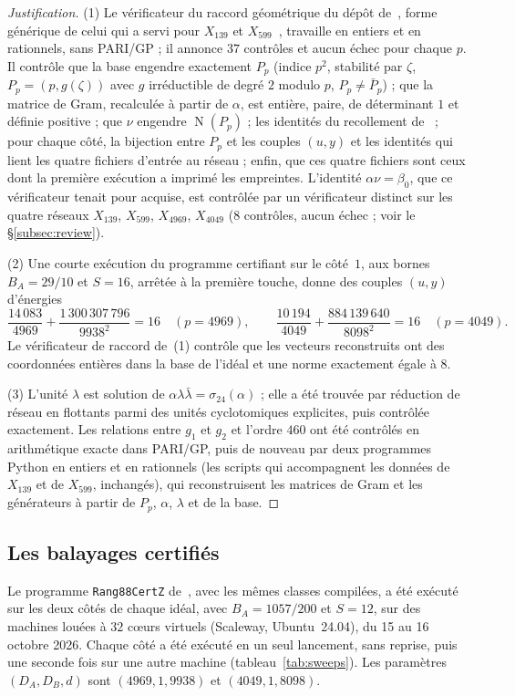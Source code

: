 \documentclass[11pt,a4paper]{amsart}
\theoremstyle{plain}
\theoremstyle{definition}
\DeclareMathOperator{\Nm}{N}
\begin{document}
\begin{proof}[Justification]
(1) Le vérificateur du raccord géométrique du dépôt de~\cite{Gau26}, forme générique de celui qui a servi pour $X_{139}$ et $X_{599}$~\cite[prop.~6.3, 6.4]{Gau26}, travaille en entiers et en rationnels, sans PARI/GP ; il annonce $37$ contrôles et aucun échec pour chaque $p$. Il contrôle que la base engendre exactement $P_p$ (indice $p^2$, stabilité par $\zeta$, $P_p=(p,g(\zeta))$ avec $g$ irréductible de degré $2$ modulo $p$, $P_p\ne\bar P_p$) ; que la matrice de Gram, recalculée à partir de $\alpha$, est entière, paire, de déterminant $1$ et définie positive ; que $\nu$ engendre $\Nm(P_p)$ ; les identités du recollement de~\cite[prop.~4.1]{Gau26} ; pour chaque côté, la bijection entre $P_p$ et les couples $(u,y)$ et les identités qui lient les quatre fichiers d'entrée au réseau ; enfin, que ces quatre fichiers sont ceux dont la première exécution a imprimé les empreintes. L'identité $\alpha\nu=\beta_0$, que ce vérificateur tenait pour acquise, est contrôlée par un vérificateur distinct sur les quatre réseaux $X_{139}$, $X_{599}$, $X_{4969}$, $X_{4049}$ ($8$ contrôles, aucun échec ; voir le \S\ref{subsec:review}).

(2) Une courte exécution du programme certifiant sur le côté~$1$, aux bornes $B_A=29/10$ et $S=16$, arrêtée à la première touche, donne des couples $(u,y)$ d'énergies
\[
\frac{14\,083}{4969}+\frac{1\,300\,307\,796}{9938^2}=16\quad(p=4969),\qquad \frac{10\,194}{4049}+\frac{884\,139\,640}{8098^2}=16\quad(p=4049).
\]
Le vérificateur de raccord de~(1) contrôle que les vecteurs reconstruits ont des coordonnées entières dans la base de l'idéal et une norme exactement égale à $8$.

(3) L'unité $\lambda$ est solution de $\alpha\lambda\bar\lambda=\sigma_{24}(\alpha)$ ; elle a été trouvée par réduction de réseau en flottants parmi des unités cyclotomiques explicites, puis contrôlée exactement. Les relations entre $g_1$ et $g_2$ et l'ordre $460$ ont été contrôlés en arithmétique exacte dans PARI/GP, puis de nouveau par deux programmes Python en entiers et en rationnels (les scripts qui accompagnent les données de $X_{139}$ et de $X_{599}$, inchangés), qui reconstruisent les matrices de Gram et les générateurs à partir de $P_p$, $\alpha$, $\lambda$ et de la base.
\end{proof}

\subsection{Les balayages certifiés}
Le programme \texttt{Rang88CertZ} de~\cite[\S5]{Gau26}, avec les mêmes classes compilées, a été exécuté sur les deux côtés de chaque idéal, avec $B_A=1057/200$ et $S=12$, sur des machines louées à $32$ cœurs virtuels (Scaleway, Ubuntu~24.04), du 15 au 16 octobre 2026. Chaque côté a été exécuté en un seul lancement, sans reprise, puis une seconde fois sur une autre machine (tableau~\ref{tab:sweeps}). Les paramètres $(D_A,D_B,d)$ sont $(4969,1,9938)$ et $(4049,1,8098)$.
\end{document}
